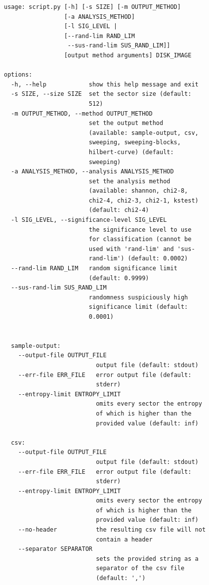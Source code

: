 \documentclass[
  digital, %
  color,   %
  oneside, %
  lof,     %
  nolot,     %
]{fithesis4}
\begin{document}
\begin{verbatim}
usage: script.py [-h] [-s SIZE] [-m OUTPUT_METHOD] 
                 [-a ANALYSIS_METHOD] 
                 [-l SIG_LEVEL | 
                 [--rand-lim RAND_LIM 
                  --sus-rand-lim SUS_RAND_LIM]]
                 [output method arguments] DISK_IMAGE

options:
  -h, --help            show this help message and exit
  -s SIZE, --size SIZE  set the sector size (default:
                        512)
  -m OUTPUT_METHOD, --method OUTPUT_METHOD
                        set the output method
                        (available: sample-output, csv,
                        sweeping, sweeping-blocks,
                        hilbert-curve) (default:
                        sweeping)
  -a ANALYSIS_METHOD, --analysis ANALYSIS_METHOD
                        set the analysis method
                        (available: shannon, chi2-8,
                        chi2-4, chi2-3, chi2-1, kstest)
                        (default: chi2-4)
  -l SIG_LEVEL, --significance-level SIG_LEVEL
                        the significance level to use
                        for classification (cannot be
                        used with 'rand-lim' and 'sus-
                        rand-lim') (default: 0.0002)
  --rand-lim RAND_LIM   random significance limit
                        (default: 0.9999)
  --sus-rand-lim SUS_RAND_LIM
                        randomness suspiciously high
                        significance limit (default:
                        0.0001)


  sample-output:
    --output-file OUTPUT_FILE
                          output file (default: stdout)
    --err-file ERR_FILE   error output file (default:
                          stderr)
    --entropy-limit ENTROPY_LIMIT
                          omits every sector the entropy
                          of which is higher than the
                          provided value (default: inf)

  csv:
    --output-file OUTPUT_FILE
                          output file (default: stdout)
    --err-file ERR_FILE   error output file (default:
                          stderr)
    --entropy-limit ENTROPY_LIMIT
                          omits every sector the entropy
                          of which is higher than the
                          provided value (default: inf)
    --no-header           the resulting csv file will not
                          contain a header
    --separator SEPARATOR
                          sets the provided string as a
                          separator of the csv file
                          (default: ',')


\end{verbatim}
\end{document}
